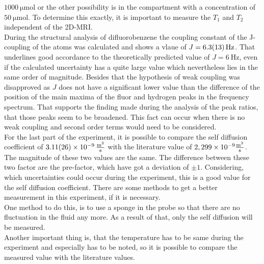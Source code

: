 $\SI{1000}{\micro\mole}$ or the other possibility is  in the compartment with a concentration of $\SI{50}{\micro\mole}$. To determine this exactly, it is important to measure the $T_1$ and $T_2$ independent of the 2D-MRI.  \\
During the structural analysis of difluorobenzene the coupling constant of the J-coupling of the atoms was calculated and shows a vlaue of $J = \SI{6.3 \pm 1.3}{\hertz}$.
That underlines good accordance to the theoretically predicted value of $J= \SI{6}{\hertz}$, even if the calculated uncertainty has a quite large value which nevertheless lies in the same order of magnitude.
Besides that the hypothesis of weak coupling was disapproved as $J$ does not have a significant lower value than the difference of the position of the main maxima of the fluor and hydrogen peaks in the frequency spectrum.
That supports the finding made during the analysis of the peak ratios, that those peaks seem to be broadened. 
This fact can occur when there is no weak coupling and second order terms would need to be considered.\\
For the last part of the experiment, it is possible to compare the self diffusion coefficient of $\SI{3,11(26)e-9}{\frac{\m^2}{s}}$ with the literature value of $2,299\times  10^{-9}\si{\frac{\m^2}{\s}}$. The magnitude of these two values are the same. The difference between these two factor are the pre-factor, which have got a deviation of $\pm1$. Considering, which uncertainties could occur during the experiment, this is a good value for the self diffusion coefficient. There are some methods to get a better measurement in this experiment, if it is necessary. \\  
One method to do this, is to use a sponge in the probe so that there are no fluctuation in the fluid any more. As a result of that, only the self diffusion will be measured.\\
Another important thing is, that the temperature has to be same during the experiment and especially has to be noted, so it is possible to compare the measured value with the literature values. 